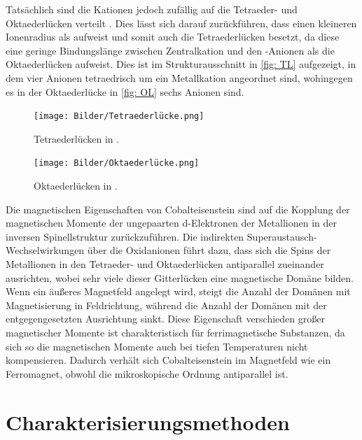\documentclass[a4paper,12pt,bibliography=totocnumbered]{scrartcl}
\begin{document}
Tatsächlich sind die Kationen jedoch zufällig auf die Tetraeder- und Oktaederlücken verteilt \cite{Rieck}.
Dies lässt sich darauf zurückführen, dass  einen kleineren Ionenradius als  aufweist und somit auch die Tetraederlücken besetzt, da diese eine geringe Bindungslänge zwischen Zentralkation und den -Anionen als die Oktaederlücken aufweist.
Dies ist im Strukturausschnitt in \autoref{fig: TL} aufgezeigt, in dem vier Anionen tetraedrisch um ein Metallkation angeordnet sind, wohingegen es in der Oktaederlücke in \autoref{fig: OL} sechs Anionen sind.


\begin{figure}[H]
    \centering
    \texttt{[image: Bilder/Tetraederlücke.png]}
    \caption{Tetraederlücken in .\cite{Rieck}}
    \label{fig: TL}
\end{figure}

\begin{figure}[H]
    \centering
    \texttt{[image: Bilder/Oktaederlücke.png]}
    \caption{Oktaederlücken in .\cite{Rieck}}
    \label{fig: OL}
\end{figure}

Die magnetischen Eigenschaften von Cobalteisenstein sind auf die Kopplung der magnetischen Momente der ungepaarten d-Elektronen der Metallionen in  der inversen Spinellstruktur zurückzuführen.
Die indirekten Superaustausch-Wechselwirkungen über die Oxidanionen führt dazu, dass sich die Spins der Metallionen in den Tetraeder- und Oktaederlücken antiparallel zueinander ausrichten, wobei sehr viele dieser Gitterlücken eine magnetische Domäne bilden. 
Wenn ein äußeres Magnetfeld angelegt wird, steigt die Anzahl der Domänen mit Magnetisierung in Feldrichtung, während die Anzahl der Domänen mit der entgegengesetzten Ausrichtung sinkt. 
Diese Eigenschaft verschieden großer magnetischer Momente ist charakteristisch für ferrimagnetische Substanzen, da sich so die magnetischen Momente auch bei tiefen Temperaturen nicht kompensieren. 
Dadurch verhält sich Cobalteisenstein im Magnetfeld wie ein Ferromagnet, obwohl die mikroskopische Ordnung antiparallel ist. \cite{Müller}

\section{Charakterisierungsmethoden}
\end{document}

